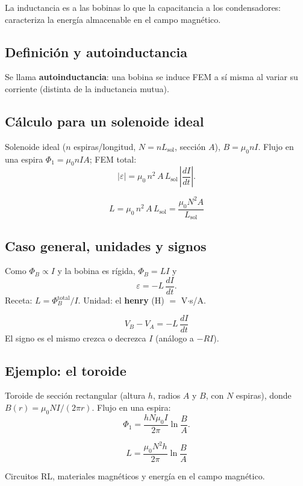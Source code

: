 \documentclass[12pt,a4paper]{article}
\begin{document}
La inductancia es a las bobinas lo que la capacitancia a los condensadores:
caracteriza la energía almacenable en el campo magnético.

\subsection{Definición y autoinductancia}

Se llama \textbf{autoinductancia}: una bobina se induce FEM a sí misma al
variar su corriente (distinta de la inductancia mutua).

\subsection{Cálculo para un solenoide ideal}

Solenoide ideal ($n$ espiras/longitud, $N = n L_{\text{sol}}$, sección $A$),
$B = \mu_0 n I$. Flujo en una espira $\Phi_1 = \mu_0 n I A$; FEM total:
\[
|\varepsilon| = \mu_0\, n^2\, A\, L_{\text{sol}}\,\left|\frac{dI}{dt}\right|.
\]

\begin{keybox}
  \[
  \boxed{L = \mu_0\, n^2\, A\, L_{\text{sol}} = \frac{\mu_0 N^2 A}{L_{\text{sol}}}}
  \]
\end{keybox}



\subsection{Caso general, unidades y signos}

Como $\Phi_B \propto I$ y la bobina es rígida, $\Phi_B = L I$ y
\[
\varepsilon = -L\,\frac{dI}{dt}.
\]
Receta: $L = \Phi_B^{\text{total}}/I$. Unidad: el \textbf{henry} (H) $=$
V$\cdot$s/A.

\begin{keybox}
  \[
  \boxed{V_B - V_A = -L\,\frac{dI}{dt}}
  \]
  El signo es el mismo crezca o decrezca $I$ (análogo a $-RI$).
\end{keybox}



\subsection{Ejemplo: el toroide}

Toroide de sección rectangular (altura $h$, radios $A$ y $B$, con $N$
espiras), donde $B(r) = \mu_0 N I/(2\pi r)$. Flujo en una espira:
\[
\Phi_1 = \frac{h N \mu_0 I}{2\pi}\ln\!\frac{B}{A}.
\]

\begin{keybox}
  \[
  \boxed{L = \frac{\mu_0 N^2 h}{2\pi}\ln\!\frac{B}{A}}
  \]
\end{keybox}



\begin{notebox}
  Circuitos RL, materiales magnéticos y energía en el campo magnético.
\end{notebox}
\end{document}
